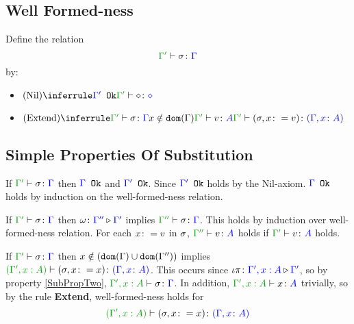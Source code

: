 \documentclass{report}
\begin{document}
\subsection{Well Formed-ness}
Define the relation $$\typerelation{\G'}{\si}{\G}$$ by:

\begin{itemize}
    \item $\ntreeruleI{Nil}{\ok{\G'}}{\typerelation{\G'}{\nil}{\nil}}$
    \item $\ntreeruleIII{Extend}{
        \typerelation{\G'}{\si}{\G}
        }{
        x\notin\dom{\G}
        }{
        \typerelation{\G'}{v}{A}
    }{
        \typerelation{\G'}{(\si, x \setto v)}{(\gax)}
    }$
\end{itemize}
\subsection{Simple Properties Of Substitution}

\begin{property}[Ok Relation]\label{SubPropOne}
    If $\typerelation{\G'}{\si}{\G}$ then  ${\color{blue} \Gamma} \texttt{ Ok}$ and ${\color{blue} \Gamma'} \texttt{ Ok}$. Since ${\color{blue} \Gamma'} \texttt{ Ok}$ holds by the Nil-axiom. ${\color{blue} \Gamma} \texttt{ Ok}$ holds by induction on the well-formed-ness relation.
\end{property}

\begin{property}[Weakening]\label{SubPropTwo}
    If $\typerelation{\G'}{\si}{\G}$ then $\omega \colon {\color{blue}\Gamma''} \triangleright {\color {blue} \Gamma'}$ implies $\typerelation{\G''}{\si}{\G}$.
    This holds by induction over well-formed-ness relation. For each $x\colon= v$ in $\sigma$, $\typerelation{\G''}{v}{A}$ holds if $\typerelation{\G'}{v}{A}$ holds.
\end{property}

\begin{property}[Extension]\label{SubPropThree}
    If $\typerelation{\G'}{\si}{\G}$ then $x \notin (\texttt{dom}(\Gamma) \cup \texttt{dom}(\Gamma''))$ implies $\typerelation{(\G', x: A)}{(\si, x \setto x)}{(\gax)}$.
    This occurs since $\iota\pi \colon {\color{blue}\Gamma',x: A} \triangleright {\color {blue} \Gamma'}$, so by property \ref{SubPropTwo}, 
    $\typerelation{\G', x: A}{\si}{\G}$.
    In addition, $\typerelation{\G', x: A}{x}{A}$ trivially, so by the rule \textbf{Extend}, well-formed-ness holds for
    \begin{equation}
        \typerelation{(\G', x:A)}{(\si, x\setto x)}{(\gax)}
    \end{equation}
\end{property}

     
    
\end{document}
